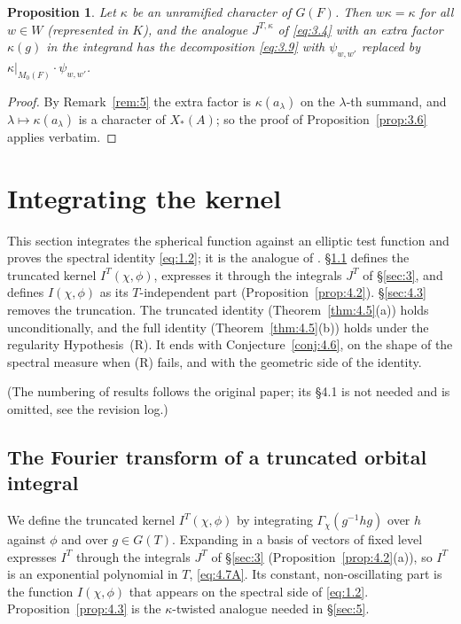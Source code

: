 \documentclass[12pt,letterpaper]{article}
\numberwithin{equation}{section}
\theoremstyle{plain}
\newtheorem{proposition}[lemma]{Proposition}
\theoremstyle{remark}
\theoremstyle{plain}
\theoremstyle{definition}
\theoremstyle{remark}
\theoremstyle{remark}
\begin{document}
\begin{proposition}\label{prop:3.7}
Let $\kappa$ be an unramified character of $G(F)$. Then $w\kappa=\kappa$ for all $w\in W$ (represented in $K$), and the analogue $J^{T,\kappa}$ of \eqref{eq:3.4} with an extra factor $\kappa(g)$ in the integrand has the decomposition \eqref{eq:3.9} with $\psi_{w,w'}$ replaced by $\kappa|_{M_0(F)}\cdot\psi_{w,w'}$.
\end{proposition}

\begin{proof}
By Remark~\ref{rem:5} the extra factor is $\kappa(a_\lambda)$ on the $\lambda$-th summand, and $\lambda\mapsto\kappa(a_\lambda)$ is a character of $X_*(A)$; so the proof of Proposition~\ref{prop:3.6} applies verbatim.
\end{proof}

\section{Integrating the kernel}\label{sec:4}

This section integrates the spherical function against an elliptic test function and proves the spectral identity \eqref{eq:1.2}; it is the analogue of \cite[Prop.~II.5]{Wa89a}. \S\ref{sec:4.2} defines the truncated kernel $I^T(\chi,\phi)$, expresses it through the integrals $J^T$ of \S\ref{sec:3}, and defines $I(\chi,\phi)$ as its $T$-independent part (Proposition~\ref{prop:4.2}). \S\ref{sec:4.3} removes the truncation. The truncated identity (Theorem~\ref{thm:4.5}(a)) holds unconditionally, and the full identity (Theorem~\ref{thm:4.5}(b)) holds under the regularity Hypothesis~(R). It ends with Conjecture~\ref{conj:4.6}, on the shape of the spectral measure when (R) fails, and with the geometric side of the identity.

(The numbering of results follows the original paper; its \S4.1 is not needed and is omitted, see the revision log.)
\setcounter{subsection}{1}%
\setcounter{lemma}{1}


\subsection{The Fourier transform of a truncated orbital integral}\label{sec:4.2}

We define the truncated kernel $I^T(\chi,\phi)$ by integrating $\Gamma_\chi(g^{-1}hg)$ over $h$ against $\phi$ and over $g\in G(T)$. Expanding in a basis of vectors of fixed level expresses $I^T$ through the integrals $J^T$ of \S\ref{sec:3} (Proposition~\ref{prop:4.2}(a)), so $I^T$ is an exponential polynomial in $T$, \eqref{eq:4.7A}. Its constant, non-oscillating part is the function $I(\chi,\phi)$ that appears on the spectral side of \eqref{eq:1.2}. Proposition~\ref{prop:4.3} is the $\kappa$-twisted analogue needed in \S\ref{sec:5}.
\end{document}
